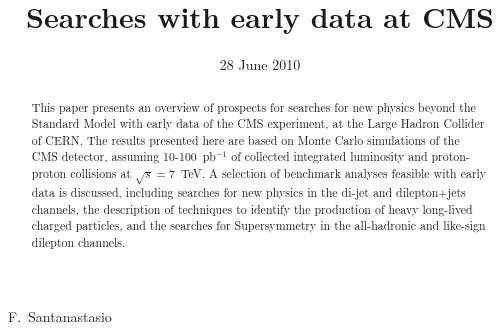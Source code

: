 \documentclass{cmspaper}
\begin{document}

\begin{titlepage}

   \date{28 June 2010}

  \title{Searches with early data at CMS}
  \begin{Authlist}
    F.~Santanastasio
  \end{Authlist}




  \begin{abstract}
    This paper presents an overview of prospects for searches for new physics 
    beyond the Standard Model with early data of the CMS experiment, at the Large Hadron Collider of CERN. 
    The results presented here are based on Monte Carlo simulations of the 
    CMS detector, assuming 10-100~pb$^{-1}$ of collected integrated 
    luminosity and proton-proton collisions at $\sqrt{s} = 7$~TeV. 
    A selection of benchmark analyses feasible with early data is discussed,  
    including searches for new physics in the di-jet and dilepton+jets channels, 
    the description of techniques to identify the production of heavy long-lived charged particles, 
    and the searches for Supersymmetry in the all-hadronic and like-sign dilepton channels.
  \end{abstract} 


  
\end{titlepage}

\setcounter{page}{1}%
\end{document}

